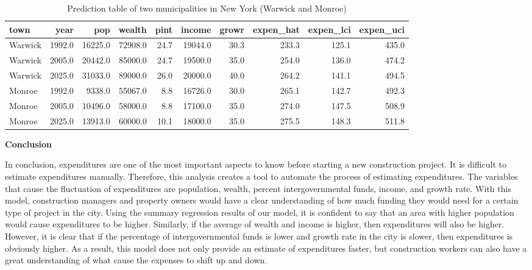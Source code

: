 \documentclass[11pt]{article}\usepackage[]{graphicx}\usepackage[]{color}
\begin{document}
\begin{center}
\begin{table}[ht]
\centering
\begin{tabular}{lrrrrrrrrr}
  \hline
town & year & pop & wealth & pint & income & growr & expen\_hat & expen\_lci & expen\_uci \\ 
  \hline
Warwick & 1992.0 & 16225.0 & 72908.0 & 24.7 & 19044.0 & 30.3 & 233.3 & 125.1 & 435.0 \\ 
  Warwick & 2005.0 & 20442.0 & 85000.0 & 24.7 & 19500.0 & 35.0 & 254.0 & 136.0 & 474.2 \\ 
  Warwick & 2025.0 & 31033.0 & 89000.0 & 26.0 & 20000.0 & 40.0 & 264.2 & 141.1 & 494.5 \\ 
  Monroe & 1992.0 & 9338.0 & 55067.0 & 8.8 & 16726.0 & 30.0 & 265.1 & 142.7 & 492.3 \\ 
  Monroe & 2005.0 & 10496.0 & 58000.0 & 8.8 & 17100.0 & 35.0 & 274.0 & 147.5 & 508.9 \\ 
  Monroe & 2025.0 & 13913.0 & 60000.0 & 10.1 & 18000.0 & 35.0 & 275.5 & 148.3 & 511.8 \\ 
   \hline
\end{tabular}
\caption{Prediction table of two municipalities in New York (Warwick and Monroe)} 
\label{pred_tab}
\end{table}

\end{center}

\noindent\textbf{Conclusion}

\noindent In conclusion, expenditures are one of the most important aspects to know before starting a new construction project. It is difficult to estimate expenditures manually. Therefore, this analysis creates a tool to automate the process of estimating expenditures. The variables that cause the fluctuation of expenditures are population, wealth, percent intergovernmental funds, income, and growth rate. With this model, construction managers and property owners would have a clear understanding of how much funding they would need for a certain type of project in the city. Using the summary regression results of our model, it is confident to say that an area with higher population would cause expenditures to be higher. Similarly, if the average of wealth and income is higher, then expenditures will also be higher. However, it is clear that if the percentage of intergovernmental funds is lower and growth rate in the city is slower, then expenditures is obviously higher. As a result, this model does not only provide an estimate of expenditures faster, but construction workers can also have a great understanding of what cause the expenses to shift up and down.
\end{document}
